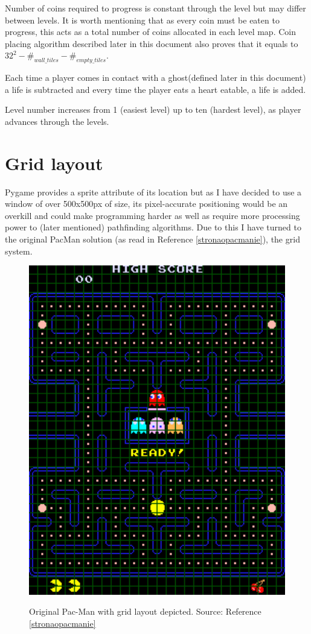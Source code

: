 \documentclass[11pt,a4paper]{report}
\newenvironment{img}{
	\begin{center}
		\begin{figure}[H]
			\begin{center}
			
}{
	\end{center}
		\end{figure}
			\end{center}
}
\begin{document}
				Number of coins required to progress is constant through the level but may differ between levels. It is worth mentioning that as every coin must be eaten to progress, this acts as a total number of coins allocated in each level map. Coin placing algorithm described later in this document also proves that it equals to $32^2-\#_{wall\_tiles}-\#_{empty\_ tiles}$.
				
				Each time a player comes in contact with a ghost(defined later in this document) a life is subtracted and every time the player eats a heart eatable, a life is added.
				
				Level number increases from 1 (easiest level) up to ten (hardest level), as player advances through the levels.
		\section{Grid layout}
			Pygame provides a sprite attribute of its location but as I have decided to use a window of over 500x500px of size, its pixel-accurate positioning would be an overkill and could make programming harder as well as require more processing power to (later mentioned) pathfinding algorithms.
			Due to this I have turned to the original PacMan solution (as read in Reference \ref{stronaopacmanie}), the grid system.
			\begin{img}
				\includegraphics[width=350pt]{images/oryginal_pacman_grid}\\
				\caption{Original Pac-Man with grid layout depicted. Source: Reference \ref{stronaopacmanie}}
			\end{img}
\end{document}
